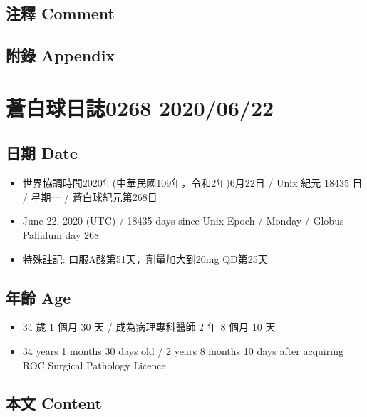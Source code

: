 \documentclass[a5paper, 11pt
]{book}
\providecommand{\tightlist}{%
  \setlength{\itemsep}{0pt}\setlength{\parskip}{0pt}}
\begin{document}
\hypertarget{ux6ce8ux91cb-comment-18}{%
\subsection{注釋 Comment}\label{ux6ce8ux91cb-comment-18}}

\hypertarget{ux9644ux9304-appendix-18}{%
\subsection{附錄 Appendix}\label{ux9644ux9304-appendix-18}}

\hypertarget{ux84bcux767dux7403ux65e5ux8a8c0268-20200622}{%
\section{蒼白球日誌0268
2020/06/22}\label{ux84bcux767dux7403ux65e5ux8a8c0268-20200622}}

\hypertarget{ux65e5ux671f-date-19}{%
\subsection{日期 Date}\label{ux65e5ux671f-date-19}}

\begin{itemize}
\tightlist
\item
  世界協調時間2020年(中華民國109年，令和2年)6月22日 / Unix 紀元 18435 日
  / 星期一 / 蒼白球紀元第268日
\item
  June 22, 2020 (UTC) / 18435 days since Unix Epoch / Monday / Globus
  Pallidum day 268
\item
  特殊註記: 口服A酸第51天，劑量加大到20mg QD第25天
\end{itemize}

\hypertarget{ux5e74ux9f61-age-19}{%
\subsection{年齡 Age}\label{ux5e74ux9f61-age-19}}

\begin{itemize}
\tightlist
\item
  34 歲 1 個月 30 天 / 成為病理專科醫師 2 年 8 個月 10 天
\item
  34 years 1 months 30 days old / 2 years 8 months 10 days after
  acquiring ROC Surgical Pathology Licence
\end{itemize}

\hypertarget{ux672cux6587-content-19}{%
\subsection{本文 Content}\label{ux672cux6587-content-19}}
\end{document}
